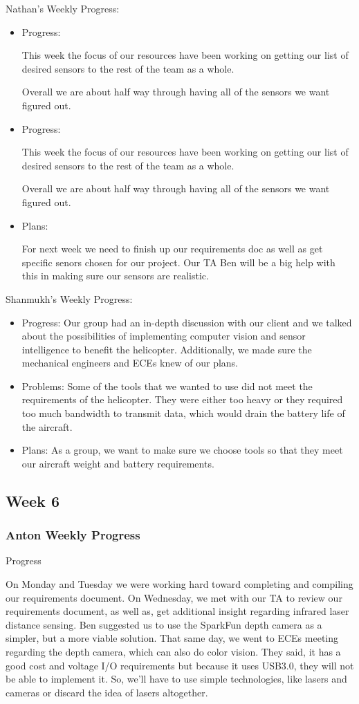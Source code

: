 \documentclass[onecolumn, oneside, letterpaper, draftclsnofoot, 10pt, compsoc]{IEEEtran}
\begin{document}
Nathan's Weekly Progress:
\begin{itemize}
    \item Progress:

This week the focus of our resources have been working on getting our list of desired sensors to the rest of the team as a whole.

Overall we are about half way through having all of the sensors we want figured out.
    \item Progress:

This week the focus of our resources have been working on getting our list of desired sensors to the rest of the team as a whole.

Overall we are about half way through having all of the sensors we want figured out.
    \item Plans:

For next week we need to finish up our requirements doc as well as get specific senors chosen for our project. Our TA Ben will be a big help with this in making sure our sensors are realistic.
    \end{itemize}
Shanmukh's Weekly Progress:
\begin{itemize}
    \item Progress: Our group had an in-depth discussion with our client and we talked about the possibilities of implementing computer vision and sensor intelligence to benefit the helicopter. Additionally, we made sure the mechanical engineers and ECEs knew of our plans.
    \item Problems: Some of the tools that we wanted to use did not meet the requirements of the helicopter. They were either too heavy or they required too much bandwidth to transmit data, which would drain the battery life of the aircraft.
    \item Plans: As a group, we want to make sure we choose tools so that they meet our aircraft weight and battery requirements.
\end{itemize}


\subsection{Week 6}

\subsubsection{Anton Weekly Progress}
Progress

On Monday and Tuesday we were working hard toward completing and compiling our requirements document. On Wednesday, we met with our TA to review our requirements document, as well as, get additional insight regarding infrared laser distance sensing. Ben suggested us to use the SparkFun depth camera as a simpler, but a more viable solution. That same day, we went to ECEs meeting regarding the depth camera, which can also do color vision. They said, it has a good cost and voltage I/O requirements but because it uses USB3.0, they will not be able to implement it. So, we'll have to use simple technologies, like lasers and cameras or discard the idea of lasers altogether.
\end{document}
